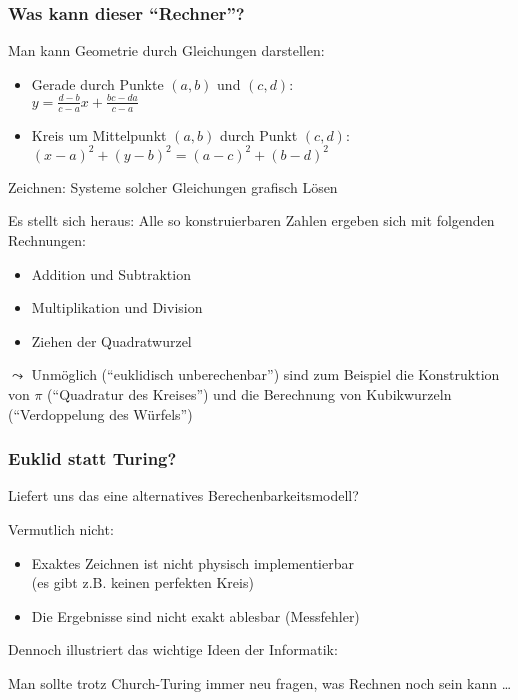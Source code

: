 \documentclass[aspectratio=1610,onlymath]{beamer}
\begin{document}
\begin{frame}\frametitle{Was kann dieser "`Rechner"'?}
\pause

Man kann Geometrie durch Gleichungen darstellen:
\begin{itemize}
\item Gerade durch Punkte $(a,b)$ und $(c,d)$:\\ $y=\frac{d-b}{c-a}x + \frac{bc-da}{c-a}$
\item Kreis um Mittelpunkt $(a,b)$ durch Punkt $(c,d)$: $(x-a)^2 + (y-b)^2 = (a-c)^2 + (b-d)^2$
\end{itemize}

Zeichnen: Systeme solcher Gleichungen grafisch Lösen
\bigskip\pause

\alert{Es stellt sich heraus:} Alle so konstruierbaren Zahlen ergeben sich mit folgenden Rechnungen:
\begin{itemize}
\item Addition und Subtraktion
\item Multiplikation und Division
\item Ziehen der Quadratwurzel
\end{itemize}\pause

$\leadsto$ Unmöglich ("`euklidisch unberechenbar"') sind zum Beispiel die Konstruktion von $\pi$ (\alert{"`Quadratur des Kreises"'})
und die Berechnung von Kubikwurzeln (\alert{"`Verdoppelung des Würfels"'})

\end{frame}

\begin{frame}\frametitle{Euklid statt Turing?}

Liefert uns das eine alternatives Berechenbarkeitsmodell?\pause
\bigskip

\alert{Vermutlich nicht:}
\begin{itemize}
\item Exaktes Zeichnen ist nicht physisch implementierbar\\ (es gibt z.B. keinen perfekten Kreis)
\item Die Ergebnisse sind nicht exakt ablesbar (Messfehler)
\end{itemize}\pause

Dennoch illustriert das wichtige Ideen der Informatik:\bigskip

\bigskip

Man sollte trotz Church-Turing immer neu fragen, was Rechnen noch sein kann \ldots

\end{frame}
\end{document}
